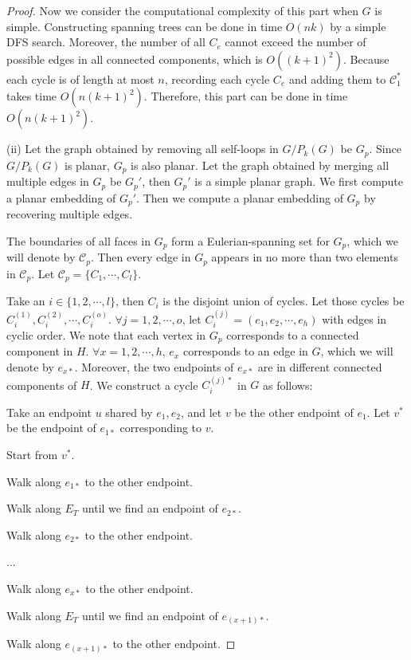 \documentclass[10pt,fleqn]{article}
\newcommand{\mc}[1]{\mathcal{#1}}
\begin{document}
\begin{proof}
		Now we consider the computational complexity of this part when $G$ is simple. Constructing spanning trees can be done in time $O(nk)$ by a simple DFS search. Moreover, the number of all $C_e$ cannot exceed the number of possible edges in all connected components, which is $O((k+1)^2)$. Because each cycle is of length at most $n$, recording each cycle $C_e$ and adding them to $\mc{C}_1^*$ takes time $O(n(k+1)^2)$. Therefore, this part can be done in time $O(n(k+1)^2)$.\par
		(ii) Let the graph obtained by removing all self-loops in $G/ P_k(G)$ be $G_p$. Since $G/ P_k(G)$ is planar, $G_p$ is also planar. Let the graph obtained by merging all multiple edges in $G_p$ be $G_p'$, then $G_p'$ is a simple planar graph. We first compute a planar embedding of $G_p'$. Then we compute a planar embedding of $G_p$ by recovering multiple edges.\par
		The boundaries of all faces in $G_p$ form a Eulerian-spanning set for $G_p$, which we will denote by $\mc{C}_p$. Then every edge in $G_p$ appears in no more than two elements in $\mc{C}_p$. Let $\mc{C}_p=\{C_1,\cdots,C_l\}$. \par
		Take an $i\in\{1,2,\cdots,l\}$, then $C_i$ is the disjoint union of cycles. Let those cycles be $C_i^{(1)},C_i^{(2)},\cdots,C_i^{(o)}$. $\forall j=1,2,\cdots,o$, let $C_i^{(j)}=(e_{1},e_{2},\cdots,e_{h})$ with edges in cyclic order. We note that each vertex in $G_p$ corresponds to a connected component in $H$. $\forall x=1,2,\cdots,h$, $e_x$ corresponds to an edge in $G$, which we will denote by $e_{x*}$. Moreover, the two endpoints of $e_{x*}$ are in different connected components of $H$. We construct a cycle $C_i^{(j)*}$ in $G$ as follows: \par 
		Take an endpoint $u$ shared by $e_{1},e_{2}$, and let $v$ be the other endpoint of $e_{1}$. Let $v^*$ be the endpoint of $e_{1*}$ corresponding to $v$.\par
		Start from $v^*$.\par
		Walk along $e_{1*}$ to the other endpoint.\par 
		Walk along $E_T$ until we find an endpoint of $e_{2*}$. \par
		Walk along $e_{2*}$ to the other endpoint. \par
		... \par
		Walk along $e_{x*}$ to the other endpoint.\par 
		Walk along $E_T$ until we find an endpoint of $e_{(x+1)*}$. \par
		Walk along $e_{(x+1)*}$ to the other endpoint. \par

\end{proof}
\end{document}
